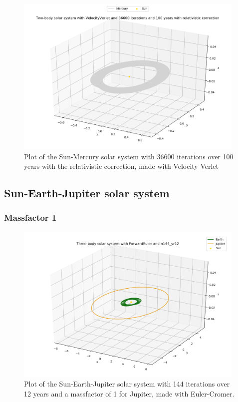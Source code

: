 \documentclass{article}
\begin{document}
    \begin{figure}[H]
        \centering
        \includegraphics[width = 11cm]{img/plot3D_S_M_V_n36600_yr100.png}
        \caption{Plot of the Sun-Mercury solar system with 36600 iterations over 100 years with the relativistic correction, made with Velocity Verlet}
        \label{fig:plot3D_S_M_V_n36600_yr100}
    \end{figure}


\subsection{Sun-Earth-Jupiter solar system}

\subsubsection{Massfactor 1}

    \begin{figure}[H]
        \centering
        \includegraphics[width = 11cm]{img/plot3D_S_E_J_F_n144_yr12.png}
        \caption{Plot of the Sun-Earth-Jupiter solar system with 144 iterations over 12 years and a massfactor of 1 for Jupiter, made with Euler-Cromer.}
        \label{fig:plot3D_S_E_J_F_n144_yr12}
    \end{figure}
\end{document}

